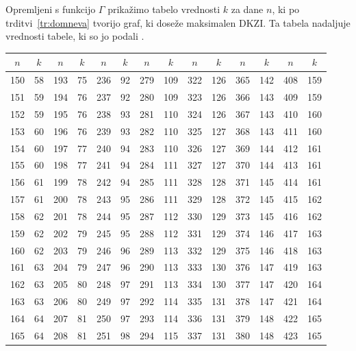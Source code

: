 \documentclass[fin1, tisk]{fmfdelo}
\begin{document}
Opremljeni s funkcijo $\Gamma$ prikažimo tabelo vrednosti $k$ za dane $n$, ki po 
trditvi~\ref{tr:domneva} tvorijo graf, ki doseže maksimalen DKZI. Ta tabela nadaljuje 
vrednosti tabele, ki so jo podali \textcite{saber2025}. \newline\newline
{\scriptsize
\begin{center}
\begin{tabular}{|c|c||c|c||c|c||c|c||c|c||c|c||c|c|}
\hline
$n$ & $k$ & $n$ & $k$ & $n$ & $k$ & $n$ & $k$ & $n$ & $k$ & $n$ & $k$ & $n$ & $k$\\ \hline
150 & 58 & 193 & 75 & 236 & 92 & 279 & 109 & 322 & 126 & 365 & 142 & 408 & 159\\ \hline
151 & 59 & 194 & 76 & 237 & 92 & 280 & 109 & 323 & 126 & 366 & 143 & 409 & 159\\ \hline
152 & 59 & 195 & 76 & 238 & 93 & 281 & 110 & 324 & 126 & 367 & 143 & 410 & 160\\ \hline
153 & 60 & 196 & 76 & 239 & 93 & 282 & 110 & 325 & 127 & 368 & 143 & 411 & 160\\ \hline
154 & 60 & 197 & 77 & 240 & 94 & 283 & 110 & 326 & 127 & 369 & 144 & 412 & 161\\ \hline
155 & 60 & 198 & 77 & 241 & 94 & 284 & 111 & 327 & 127 & 370 & 144 & 413 & 161\\ \hline
156 & 61 & 199 & 78 & 242 & 94 & 285 & 111 & 328 & 128 & 371 & 145 & 414 & 161\\ \hline
157 & 61 & 200 & 78 & 243 & 95 & 286 & 111 & 329 & 128 & 372 & 145 & 415 & 162\\ \hline
158 & 62 & 201 & 78 & 244 & 95 & 287 & 112 & 330 & 129 & 373 & 145 & 416 & 162\\ \hline
159 & 62 & 202 & 79 & 245 & 95 & 288 & 112 & 331 & 129 & 374 & 146 & 417 & 163\\ \hline
160 & 62 & 203 & 79 & 246 & 96 & 289 & 113 & 332 & 129 & 375 & 146 & 418 & 163\\ \hline
161 & 63 & 204 & 79 & 247 & 96 & 290 & 113 & 333 & 130 & 376 & 147 & 419 & 163\\ \hline
162 & 63 & 205 & 80 & 248 & 97 & 291 & 113 & 334 & 130 & 377 & 147 & 420 & 164\\ \hline
163 & 63 & 206 & 80 & 249 & 97 & 292 & 114 & 335 & 131 & 378 & 147 & 421 & 164\\ \hline
164 & 64 & 207 & 81 & 250 & 97 & 293 & 114 & 336 & 131 & 379 & 148 & 422 & 165\\ \hline
165 & 64 & 208 & 81 & 251 & 98 & 294 & 115 & 337 & 131 & 380 & 148 & 423 & 165\\ \hline

\end{tabular}
\end{center}}
\end{document}
